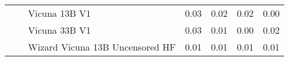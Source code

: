 \begin{table}[ht]
\begin{tabular}{l|l|l|rrrr}
 &  & Vicuna 13B V1 & {\cellcolor[HTML]{E2EDF5}} \color[HTML]{000000} 0.03 & {\cellcolor[HTML]{E5EFF6}} \color[HTML]{000000} 0.02 & {\cellcolor[HTML]{ECF4F9}} \color[HTML]{000000} 0.02 & {\cellcolor[HTML]{F6FBFC}} \color[HTML]{000000} 0.00 \\
 &  & Vicuna 33B V1 & {\cellcolor[HTML]{DCE9F2}} \color[HTML]{000000} 0.03 & {\cellcolor[HTML]{EEF5F9}} \color[HTML]{000000} 0.01 & {\cellcolor[HTML]{F5FAFC}} \color[HTML]{000000} 0.00 & {\cellcolor[HTML]{ECF4F9}} \color[HTML]{000000} 0.02 \\
 &  & Wizard Vicuna 13B Uncensored HF & {\cellcolor[HTML]{EEF6FA}} \color[HTML]{000000} 0.01 & {\cellcolor[HTML]{EDF5F9}} \color[HTML]{000000} 0.01 & {\cellcolor[HTML]{F2F8FB}} \color[HTML]{000000} 0.01 & {\cellcolor[HTML]{F3F9FB}} \color[HTML]{000000} 0.01 \\
\bottomrule
\end{tabular}
            
\end{table}
